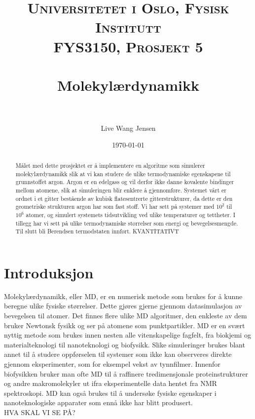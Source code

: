 \documentclass[paper=a4, fontsize=11pt]{scrartcl} %
\title{	
\normalfont \normalsize 
\textsc{Universitetet i Oslo, Fysisk Institutt \\
										FYS3150, Prosjekt 5} \\ [25pt] %
\horrule{0.5pt} \\[0.4cm] %
\huge Molekylærdynamikk \\ %
\horrule{2pt} \\[0.5cm] %
}
\author{Live Wang Jensen} %
\date{\normalsize\today} %
\numberwithin{equation}{section} %
\numberwithin{figure}{section} %
\numberwithin{table}{section} %
\begin{document}
\maketitle 
\begin{abstract}
Målet med dette prosjektet er å implementere en algoritme som simulerer molekylærdynamikk slik at vi kan studere de ulike termodynamiske egenskapene til grunnstoffet argon. Argon er en edelgass og vil derfor ikke danne kovalente bindinger mellom atomene, slik at simuleringen blir enklere å gjennomføre. Systemet vårt er ordnet i et gitter bestående av kubisk flatesentrerte gitterstrukturer, da dette er den geometriske strukturen argon har som fast stoff. Vi har sett på systemer med $10^2$ til $10^6$ atomer, og simulert systemets tidsutvikling ved ulike temperaturer og tettheter. I tillegg har vi sett på ulike termodynamiske størrelser som energi og bevegelsesmengde. Til slutt bli Berendsen termodstaten innført.
KVANTITATIVT

\end{abstract}

\tableofcontents


\section{Introduksjon}
Molekylærdynamikk, eller MD, er en numerisk metode som brukes for å kunne beregne ulike fysiske størrelser. Dette gjøres gjerne gjennom datasimulasjon av bevegelsen til atomer. Det finnes flere ulike MD algoritmer, den enkleste av dem bruker Newtonsk fysikk og ser på atomene som punktpartikler. MD er en svært nyttig metode som brukes innen nesten alle vitenskapelige fagfelt, fra biokjemi og materialteknologi til nanoteknologi og biofysikk. Slike simuleringer brukes blant annet til å studere oppførselen til systemer som ikke kan observeres direkte gjennom eksperimenter, som for eksempel vekst av tynnfilmer. Innenfor biofysikken bruker man ofte MD til å raffinere tredimensjonale proteinstrukturer og andre makromolekyler ut ifra eksperimentelle data hentet fra NMR spektroskopi. MD kan også brukes til å undersøke fysiske egenskaper i nanoteknologiske apparater som ennå ikke har blitt produsert. 
\\
HVA SKAL VI SE PÅ?
\end{document}
